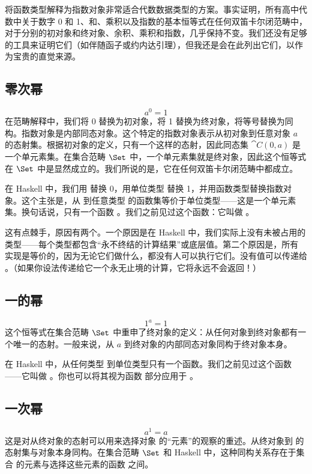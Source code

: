 将函数类型解释为指数对象非常适合代数数据类型的方案。事实证明，所有高中代数中关于数字 0 和 1、和、乘积以及指数的基本恒等式在任何双笛卡尔闭范畴中，对于分别的初对象和终对象、余积、乘积和指数，几乎保持不变。我们还没有足够的工具来证明它们（如伴随函子或约内达引理），但我还是会在此列出它们，以作为宝贵的直觉来源。

\subsection{零次幂}

\[a^{0} = 1\]
在范畴解释中，我们将 0 替换为初对象，将 1 替换为终对象，将等号替换为同构。指数对象是内部同态对象。这个特定的指数对象表示从初对象到任意对象 $a$ 的态射集。根据初对象的定义，只有一个这样的态射，因此同态集 $\cat{C}(0, a)$ 是一个单元素集。在集合范畴 $\Set$ 中，一个单元素集就是终对象，因此这个恒等式在 $\Set$ 中是显然成立的。我们所说的是，它在任何双笛卡尔闭范畴中都成立。

在 Haskell 中，我们用  替换 0，用单位类型 \code{()} 替换 1，并用函数类型替换指数对象。这个主张是，从  到任意类型  的函数集等价于单位类型——这是一个单元素集。换句话说，只有一个函数 。我们之前见过这个函数：它叫做 。

这有点棘手，原因有两个。一个原因是在 Haskell 中，我们实际上没有未被占用的类型——每个类型都包含“永不终结的计算结果”或底层值。第二个原因是，所有  实现是等价的，因为无论它们做什么，都没有人可以执行它们。没有值可以传递给 。（如果你设法传递给它一个永无止境的计算，它将永远不会返回！）

\subsection{一的幂}

\[1^{a} = 1\]
这个恒等式在集合范畴 $\Set$ 中重申了终对象的定义：从任何对象到终对象都有一个唯一的态射。一般来说，从 $a$ 到终对象的内部同态对象同构于终对象本身。

在 Haskell 中，从任何类型  到单位类型只有一个函数。我们之前见过这个函数——它叫做 。你也可以将其视为函数  部分应用于 \code{()}。

\subsection{一次幂}

\[a^{1} = a\]
这是对从终对象的态射可以用来选择对象  的“元素”的观察的重述。从终对象到  的态射集与对象本身同构。在集合范畴 $\Set$ 和 Haskell 中，这种同构关系存在于集合  的元素与选择这些元素的函数  之间。

